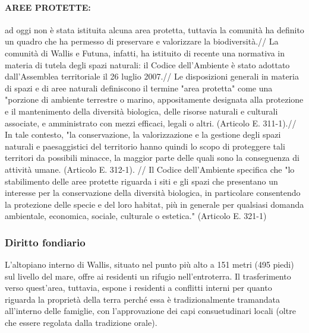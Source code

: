 \documentclass[fleqn,10pt]{SelfArx} %
\begin{document}
\paragraph{AREE PROTETTE:}
ad oggi non è stata istituita alcuna area protetta, tuttavia la comunità ha definito un quadro che ha permesso di preservare e valorizzare la biodiversità.// 
La comunità di Wallis e Futuna, infatti, ha istituito di recente una normativa in materia di tutela degli spazi naturali: il Codice dell'Ambiente è stato adottato dall'Assemblea territoriale il 26 luglio 2007.//
Le disposizioni generali in materia di spazi e di aree naturali definiscono il termine "area protetta" come una "porzione di ambiente terrestre o marino, appositamente designata alla protezione e il mantenimento della diversità biologica, delle risorse naturali e culturali associate, e amministrato con mezzi efficaci, legali o altri. (Articolo E. 311-1).// 
In tale contesto, "la conservazione, la valorizzazione e la  gestione degli spazi naturali e paesaggistici del territorio hanno quindi lo scopo di proteggere tali territori da possibili minacce, la maggior parte delle quali sono la conseguenza di attività umane. (Articolo E. 312-1). //
Il Codice dell'Ambiente specifica che "lo stabilimento delle aree protette riguarda i siti e gli spazi che presentano un interesse per la conservazione della diversità biologica, in particolare consentendo la protezione delle specie e del loro habitat, più in generale per qualsiasi domanda ambientale, economica, sociale, culturale o estetica." (Articolo E. 321-1)

\subsubsection{Diritto fondiario}
L'altopiano interno di Wallis, situato nel punto più alto a 151 metri (495 piedi) sul livello del mare, offre ai residenti un rifugio nell'entroterra. Il trasferimento verso quest'area, tuttavia, espone i residenti a conflitti interni per quanto riguarda la proprietà della terra perché essa è tradizionalmente tramandata all'interno delle famiglie, con l'approvazione dei capi consuetudinari locali (oltre che essere regolata dalla tradizione orale).
\end{document}

